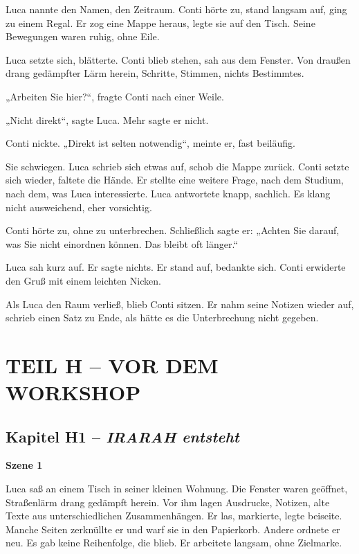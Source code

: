 \documentclass[
]{article}
\begin{document}
Luca nannte den Namen, den Zeitraum. Conti hörte zu, stand langsam auf, ging zu einem Regal. Er zog eine Mappe heraus, legte sie auf den Tisch. Seine Bewegungen waren ruhig, ohne Eile.

Luca setzte sich, blätterte. Conti blieb stehen, sah aus dem Fenster. Von draußen drang gedämpfter Lärm herein, Schritte, Stimmen, nichts Bestimmtes.

„Arbeiten Sie hier?{\kern0pt}``, fragte Conti nach einer Weile.

„Nicht direkt``, sagte Luca. Mehr sagte er nicht.

Conti nickte. „Direkt ist selten notwendig``, meinte er, fast beiläufig.

Sie schwiegen. Luca schrieb sich etwas auf, schob die Mappe zurück. Conti setzte sich wieder, faltete die Hände. Er stellte eine weitere Frage, nach dem Studium, nach dem, was Luca interessierte. Luca antwortete knapp, sachlich. Es klang nicht ausweichend, eher vorsichtig.

Conti hörte zu, ohne zu unterbrechen. Schließlich sagte er: „Achten Sie darauf, was Sie nicht einordnen können. Das bleibt oft länger.``

Luca sah kurz auf. Er sagte nichts. Er stand auf, bedankte sich. Conti erwiderte den Gruß mit einem leichten Nicken.

Als Luca den Raum verließ, blieb Conti sitzen. Er nahm seine Notizen wieder auf, schrieb einen Satz zu Ende, als hätte es die Unterbrechung nicht gegeben.

\section{TEIL H -- VOR DEM WORKSHOP}\label{teil-h-vor-dem-workshop}

\subsection{\texorpdfstring{Kapitel H1 -- \emph{IRARAH entsteht}}{Kapitel H1 -- IRARAH entsteht}}\label{kapitel-h1-irarah-entsteht}

\textbf{Szene 1}

Luca saß an einem Tisch in seiner kleinen Wohnung. Die Fenster waren geöffnet, Straßenlärm drang gedämpft herein. Vor ihm lagen Ausdrucke, Notizen, alte Texte aus unterschiedlichen Zusammenhängen. Er las, markierte, legte beiseite. Manche Seiten zerknüllte er und warf sie in den Papierkorb. Andere ordnete er neu. Es gab keine Reihenfolge, die blieb. Er arbeitete langsam, ohne Zielmarke.
\end{document}
